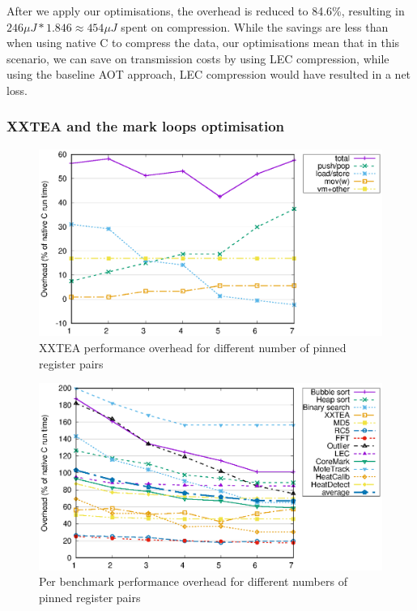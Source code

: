 After we apply our optimisations, the overhead is reduced to 84.6\%, resulting in $246 \mu J * 1.846 \approx 454 \mu J$ spent on compression. While the savings are less than when using native C to compress the data, our optimisations mean that in this scenario, we can save on transmission costs by using LEC compression, while using the baseline AOT approach, LEC compression would have resulted in a net loss.

\subsubsection{XXTEA and the mark loops optimisation}

\begin{figure}
\centering
\includegraphics[width=\mygraphsize]{pinnedregs-performance-xxtea.eps}
\caption{XXTEA performance overhead for different number of pinned register pairs}
\label{fig-performance-pinnedregs-xxtea-per-opcode-category}
\end{figure}

\begin{figure}
\centering
\includegraphics[width=\mygraphsize]{pinnedregs-performance-all-benchmarks.eps}
\caption{Per benchmark performance overhead for different numbers of pinned register pairs}
\label{fig-performance-pinnedregs-per-benchmark}
\end{figure}

